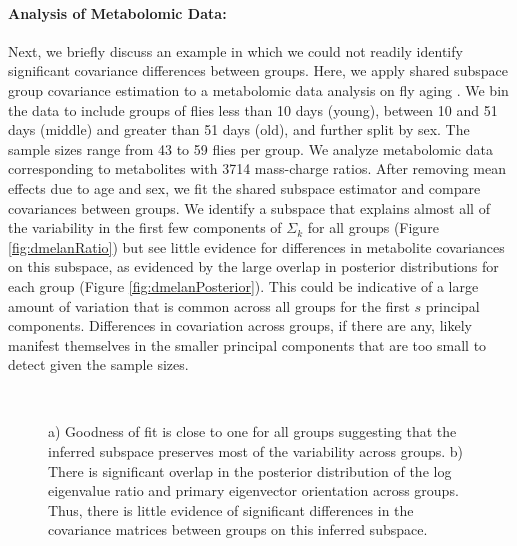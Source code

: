 \documentclass[12pt]{article}
\begin{document}
\paragraph{Analysis of Metabolomic Data:} Next, we briefly discuss an
example in which we could not readily identify significant covariance
differences between groups.  Here, we apply shared subspace group
covariance estimation to a metabolomic data analysis on fly aging
\citep{Hoffman2014}.  We bin the data to include groups of flies less
than 10 days (young), between 10 and 51 days (middle) and greater than
51 days (old), and further split by sex. The sample sizes range from
43 to 59 flies per group.  We analyze metabolomic data corresponding
to metabolites with 3714 mass-charge ratios.  After removing mean
effects due to age and sex, we fit the shared subspace estimator and
compare covariances between groups.  We identify a subspace that
explains almost all of the variability in the first few components of
$\Sigma_k$ for all groups (Figure \ref{fig:dmelanRatio}) but see
little evidence for differences in metabolite covariances on this
subspace, as evidenced by the large overlap in posterior distributions
for each group (Figure \ref{fig:dmelanPosterior}). This could be
indicative of a large amount of variation that is common across all
groups for the first $s$ principal components. Differences in
covariation across groups, if there are any, likely manifest
themselves in the smaller principal components that are too small to
detect given the sample sizes.

\begin{figure}[t]
    \centering
    ~ %
    \caption{a) Goodness of fit is close to one for all groups
      suggesting that the inferred subspace preserves most of the
      variability across groups. b) There is significant overlap in
      the posterior distribution of the log eigenvalue ratio and primary
      eigenvector orientation across groups. Thus, there is little
      evidence of significant differences in the covariance matrices
      between groups on this inferred subspace.  }
\end{figure}
\end{document}
